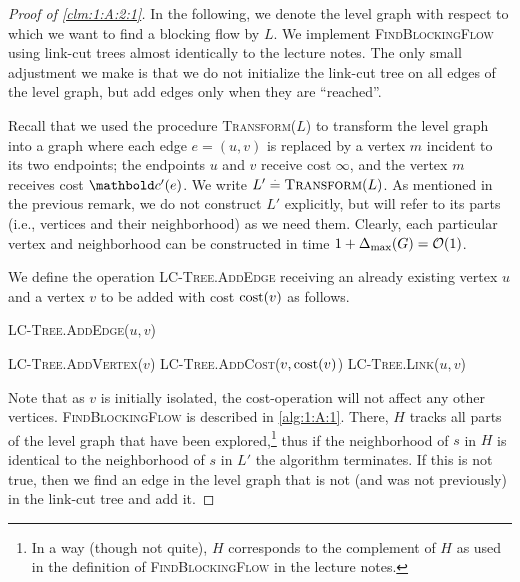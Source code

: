 \documentclass{tufte-handout}
\begin{document}
\begin{proof}[Proof of \cref{clm:1:A:2:1}]
In the following, we denote the level graph with respect to which we want to find a blocking flow by $L$. We implement \textsc{FindBlockingFlow} using link-cut trees almost identically to the lecture notes. The only small adjustment we make is that we do not initialize the link-cut tree on all edges of the level graph, but add edges only when they are ``reached''.

Recall that we used the procedure \textsc{Transform($L$)} to transform the level graph into a graph where each edge $e = (u,v)$ is replaced by a vertex $m$ incident to its two endpoints; the endpoints $u$ and $v$ receive cost $\infty$, and the vertex $m$ receives cost $\vc'(e)$. We write $L' \overset{.}{=} \textsc{Transform}(L)$. As mentioned in the previous remark, we do not construct $L'$ explicitly, but will refer to its parts (i.e., vertices and their neighborhood) as we need them. Clearly, each particular vertex and neighborhood can be constructed in time $1 + \Delta_{\max}(G) = \LandauO{1}$.

We define the operation \textsc{LC-Tree.AddEdge} receiving an already existing vertex $u$ and a vertex $v$ to be added with cost $\mathrm{cost}(v)$ as follows.

\begin{algorithm}[H]
    \caption{\textsc{LC-Tree.AddEdge($u, v$)}}
    \textsc{LC-Tree.AddVertex}($v$)\;
    \textsc{LC-Tree.AddCost($v, \mathrm{cost}(v)$)}\;
    \textsc{LC-Tree.Link($u, v$)}\;
\end{algorithm}

Note that as $v$ is initially isolated, the cost-operation will not affect any other vertices. \textsc{FindBlockingFlow} is described in \cref{alg:1:A:1}. There, $H$ tracks all parts of the level graph that have been explored,\footnote{In a way (though not quite), $H$ corresponds to the complement of $H$ as used in the definition of \textsc{FindBlockingFlow} in the lecture notes.} thus if the neighborhood of $s$ in $H$ is identical to the neighborhood of $s$ in $L'$ the algorithm terminates. If this is not true, then we find an edge in the level graph that is not (and was not previously) in the link-cut tree and add it.


\end{proof}
\end{document}
